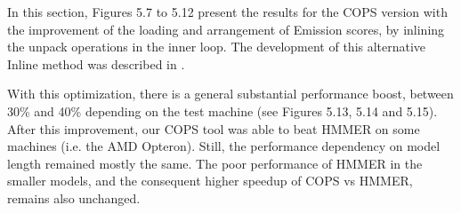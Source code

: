 In this section, Figures 5.7 to 5.12 present the results for the COPS version with the improvement of the loading and arrangement of Emission scores, by inlining the unpack operations in the inner loop. The development of this alternative Inline method was described in . 

With this optimization, there is a general substantial performance boost, between 30\% and 40\% depending on the test machine (see Figures 5.13, 5.14 and 5.15). After this improvement, our COPS tool was able to beat HMMER on some machines (i.e. the AMD Opteron). Still, the performance dependency on model length remained mostly the same. The poor performance of HMMER in the smaller models, and the consequent higher speedup of COPS vs HMMER, remains also unchanged.

\clearpage

